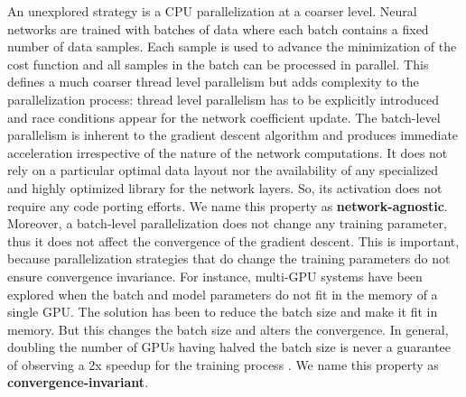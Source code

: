 An unexplored strategy is a CPU parallelization at a coarser level.
Neural networks are trained with batches of data where each batch
contains a fixed number of data samples. Each sample is used to
advance the minimization of the cost function and all samples in
the batch can be processed in parallel. This defines a much coarser
thread level parallelism but adds complexity to the
parallelization process: thread level parallelism has to be explicitly 
introduced and race conditions appear for the network coefficient 
update. 
The batch-level parallelism is inherent to the gradient descent 
algorithm and produces immediate acceleration irrespective of the 
nature of the network computations. It does not rely on a 
particular optimal data layout nor the availability of any specialized 
and highly optimized library for the network layers. So, its 
activation does not require 
any code porting efforts. We name this property as \textbf{network-agnostic}.
Moreover, a batch-level parallelization does not change any 
training parameter, thus it does not affect the convergence of the 
gradient descent. This is important, because parallelization strategies 
that do change the training parameters do not ensure convergence
invariance. For instance, multi-GPU systems have been explored when 
the batch and model parameters do not fit in the memory of a single GPU.
The solution has been to reduce the batch size and make it fit in memory.
But this changes the batch size and alters the convergence. In general, 
doubling the number of GPUs having halved the batch size is never a 
guarantee of observing a 2x speedup for the training 
process \cite{Hannun2014}. We name this property as \textbf{convergence-invariant}.


